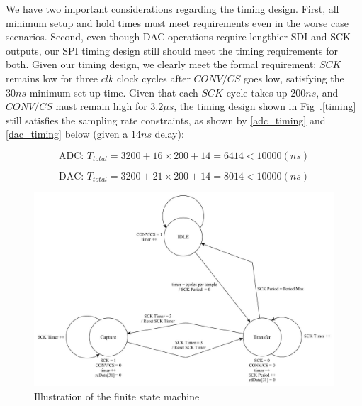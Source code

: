 \documentclass[conference]{IEEEtran}
\begin{document}
We have two important considerations regarding the timing design. First, all minimum setup and hold times must meet requirements even in the worse case scenarios. Second, even though DAC operations require lengthier SDI and SCK outputs, our SPI timing design still should meet the timing requirements for both. Given our timing design, we clearly meet the formal requirement: $SCK$ remains low for three $clk$ clock cycles after $CONV/CS$ goes low, satisfying the $30ns$ minimum set up time. Given that each $SCK$ cycle takes up $200ns$, and $CONV/CS$ must remain high for $3.2\mu{}s$, the timing design shown in Fig~.\ref{timing} still satisfies the sampling rate constraints, as shown by \eqref{adc_timing} and \eqref{dac_timing} below (given a $14ns$ delay):

\begin{equation}
    \text{ADC: }T_{total} = 3200 + 16\times 200 + 14 = 6414 < 10000(ns)
    \label{adc_timing}
\end{equation}

\begin{equation}
    \text{DAC: }T_{total} = 3200 + 21\times 200 + 14 = 8014 < 10000(ns)
    \label{dac_timing}
\end{equation}

\begin{figure}[htbp]
    \includegraphics[width=1\linewidth, left]{Figures/SPI/timing.jpg}
    \caption{Illustration of the finite state machine}
    \label{fsm}
\end{figure}
\end{document}
